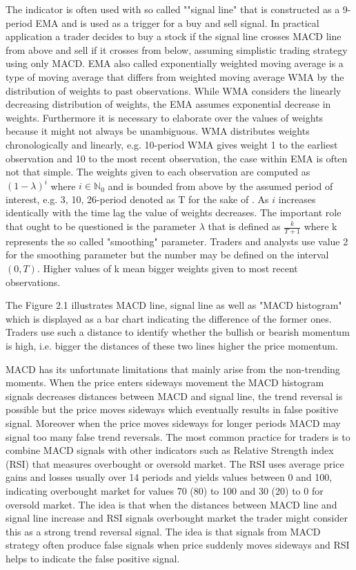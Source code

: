 The indicator is often used with so called ""signal line" that is constructed as a 9-period EMA and is used as a trigger for a buy and sell signal. In practical application a trader decides to buy a stock if the signal line crosses MACD line from above and sell if it crosses from below, assuming simplistic trading strategy using only MACD. EMA also called exponentially weighted moving average is a type of moving average that differs from weighted moving average WMA by the distribution of weights to past observations. While WMA considers the linearly decreasing distribution of weights, the EMA assumes exponential decrease in weights. Furthermore it is necessary to elaborate over the values of weights because it might not always be unambiguous. WMA distributes weights chronologically and linearly, e.g. 10-period WMA gives weight 1 to the earliest observation and 10 to the most recent observation, the case within EMA is often not that simple. The weights given to each observation are computed as $(1 - \lambda)^i$ where $i \in \mathbb{N}_0$ and is bounded from above by the assumed period of interest, e.g. 3, 10, 26-period denoted as T for the sake of . As $i$ increases identically with the time lag the value of weights decreases. The important role that ought to be questioned is the parameter $\lambda$ that is defined as $\frac{k}{T+1}$ where k represents the so called "smoothing" parameter. Traders and analysts use value 2 for the smoothing parameter but the number may be defined on the interval $(0,T)$. Higher values of k mean bigger weights given to most recent observations. 

The Figure 2.1 illustrates MACD line, signal line as well as "MACD histogram" which is displayed as a bar chart indicating the difference of the former ones. Traders use such a distance to identify whether the bullish or bearish momentum is high, i.e. bigger the distances of these two lines higher the price momentum.

MACD has its unfortunate limitations that mainly arise from the non-trending moments. When the price enters sideways movement the MACD histogram signals decreases distances between MACD and signal line, the trend reversal is possible but the price moves sideways which eventually results in false positive signal. Moreover when the price moves sideways for longer periods MACD may signal too many false trend reversals. The most common practice for traders is to combine MACD signals with other indicators such as Relative Strength index (RSI) that measures overbought or oversold market. The RSI uses average price gains and losses usually over 14 periods and yields values between 0 and 100, indicating overbought market for values 70 (80) to 100 and 30 (20) to 0 for oversold market. The idea is that when the distances between MACD line and signal line increase and RSI signals overbought market the trader might consider this as a strong trend reversal signal. The idea is that signals from MACD strategy often produce false signals when price suddenly moves sideways and RSI helps to indicate the false positive signal. 

